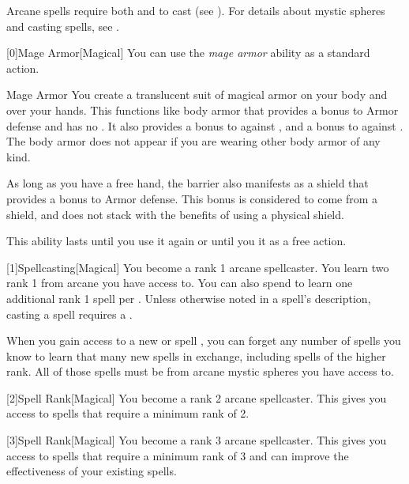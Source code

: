         Arcane spells require both  and  to cast (see ).
        For details about mystic spheres and casting spells, see .

        [0]{Mage Armor}[Magical] You can use the \textit{mage armor} ability as a standard action.
        \begin{freeability}{Mage Armor}
            You create a translucent suit of magical armor on your body and over your hands.
            This functions like body armor that provides a  bonus to Armor defense and has no .
            It also provides a  bonus to  against , and a  bonus to  against .
            The body armor does not appear if you are wearing other body armor of any kind.

            As long as you have a free hand, the barrier also manifests as a shield that provides a  bonus to Armor defense.
            This bonus is considered to come from a shield, and does not stack with the benefits of using a physical shield.

            This ability lasts until you use it again or until you  it as a free action.
        \end{freeability}

        [1]{Spellcasting}[Magical]
        You become a rank 1 arcane spellcaster.
        You learn two rank 1  from arcane  you have access to.
        You can also spend  to learn one additional rank 1 spell per .
        Unless otherwise noted in a spell's description, casting a spell requires a .

        When you gain access to a new  or spell ,
            you can forget any number of spells you know to learn that many new spells in exchange,
            including spells of the higher rank.
        All of those spells must be from arcane mystic spheres you have access to.

        [2]{Spell Rank}[Magical] You become a rank 2 arcane spellcaster.
        This gives you access to spells that require a minimum rank of 2.

        [3]{Spell Rank}[Magical] You become a rank 3 arcane spellcaster.
        This gives you access to spells that require a minimum rank of 3 and can improve the effectiveness of your existing spells.

